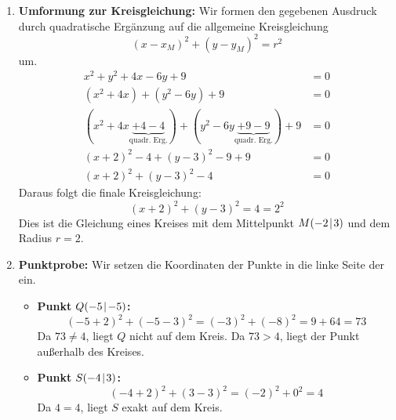 \documentclass[ngerman]{scrreprt}
\newenvironment{loesungbox}[1]
  {\needspace{5\baselineskip}\begin{loesungboxstyle}[frametitle={#1}]}
  {\end{loesungboxstyle}}
\begin{document}
\begin{loesungbox}{Lösung zu \Cref{aufg:kreisgleichung}}
\begin{enumerate}
    \item \textbf{Umformung zur Kreisgleichung:}
    Wir formen den gegebenen Ausdruck durch quadratische Ergänzung auf die allgemeine Kreisgleichung $${(x-x_M)}^2 + {(y-y_M)}^2 = r^2$$ um.
    \begin{align*}
        x^2+y^2+4x-6y+9 &= 0 \\
        (x^2+4x) + (y^2-6y) + 9 &= 0 \\
        (x^2+4x\underbrace{+4-4}_{\text{quadr. Erg.}}) + (y^2-6y\underbrace{+9-9}_{\text{quadr. Erg.}}) + 9 &= 0 \\
        {(x+2)}^2 - 4 + {(y-3)}^2 - 9 + 9 &= 0 \\
        {(x+2)}^2 + {(y-3)}^2 - 4 &= 0
    \end{align*}
    Daraus folgt die finale Kreisgleichung:
    \begin{equation}\label{eq: kreisgleichung_final}
        {(x+2)}^2 + {(y-3)}^2 = 4 = 2^2
    \end{equation}
    Dies ist die Gleichung eines Kreises mit dem Mittelpunkt $M(-2\!\mid\! 3)$ und dem Radius $r = 2$.

    \item \textbf{Punktprobe:} Wir setzen die Koordinaten der Punkte in die linke Seite der  ein.
    \begin{itemize}
        \item \textbf{Punkt} $Q(-5\!\mid\! -5)$\textbf{:}
        \begin{equation*}
            {(-5+2)}^2 + {(-5-3)}^2 = {(-3)}^2 + {(-8)}^2 = 9 + 64 = 73
        \end{equation*}
        Da $73 \neq 4$, liegt $Q$ nicht auf dem Kreis. Da $73 > 4$, liegt der Punkt außerhalb des Kreises.
        \item \textbf{Punkt} $S(-4\!\mid\! 3)$\textbf{:}
        \begin{equation*}
            {(-4+2)}^2 + {(3-3)}^2 = {(-2)}^2 + 0^2 = 4
        \end{equation*}
        Da $4 = 4$, liegt $S$ exakt auf dem Kreis.
    \end{itemize}


\end{enumerate}
\end{loesungbox}
\end{document}
